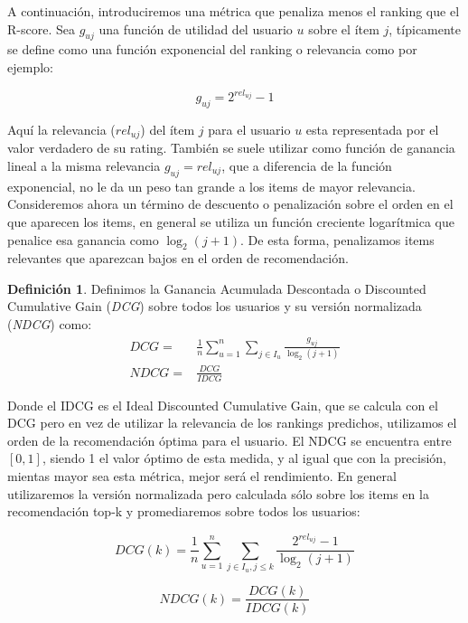 \documentclass[hidelinks,12pt,a4paper]{book}
\theoremstyle{plain}
\theoremstyle{definition}
\newtheorem{definicion}[theorem]{Definición} %
\begin{document}
A continuación, introduciremos una métrica que penaliza menos el ranking que el R-score. Sea $g_{uj}$ una función de utilidad del usuario $u$ sobre el ítem $j$, típicamente se define como una función exponencial del ranking o relevancia como por ejemplo:

\begin{equation}
g_{uj} = 2^{rel_{uj}}-1
\end{equation}

Aquí la relevancia ($rel_{uj}$) del ítem $j$ para el usuario $u$ esta representada por el valor verdadero de su rating\cite{NDCGweimer2008cofi}. También se suele utilizar como función de ganancia lineal a la misma relevancia $g_{uj}=rel_{uj}$, que a diferencia de la función exponencial, no le da un peso tan grande a los items de mayor relevancia. Consideremos ahora un término de descuento o penalización sobre el orden en el que aparecen los items, en general se utiliza un función creciente logarítmica que penalice esa ganancia como $\log_2 (j+1)$. De esta forma, penalizamos items relevantes que aparezcan bajos en el orden de recomendación. 

\begin{definicion}
Definimos la Ganancia Acumulada Descontada o Discounted Cumulative Gain (\textit{DCG}) sobre todos los usuarios y su versión normalizada (\textit{NDCG}) como:
\begin{eqnarray}
DCG =& \frac{1}{n} \sum_{u=1}^{n} \sum_{j \in I_u} \frac{g_{uj}}{\log_2(j+1)}\\
NDCG =& \frac{DCG}{IDCG}
\end{eqnarray}
\end{definicion}

Donde el IDCG es el Ideal Discounted Cumulative Gain, que se calcula con el DCG pero en vez de utilizar la relevancia de los rankings predichos, utilizamos el orden de la recomendación óptima para el usuario. El NDCG se encuentra entre $[0,1]$, siendo 1 el valor óptimo de esta medida, y al igual que con la precisión, mientas mayor sea esta métrica, mejor será el rendimiento. En general utilizaremos la versión normalizada pero calculada sólo sobre los items en la recomendación top-k y promediaremos sobre todos los usuarios:

\begin{equation}
DCG(k) = \frac{1}{n} \sum_{u=1}^{n} \sum_{j \in I_u,j\leq k} \frac{2^{rel_{uj}}-1}{\log_2(j+1)}
\end{equation}

\begin{equation}
\label{err:ndcg}
NDCG(k) = \frac{DCG(k)}{IDCG(k)}
\end{equation}
\end{document}
